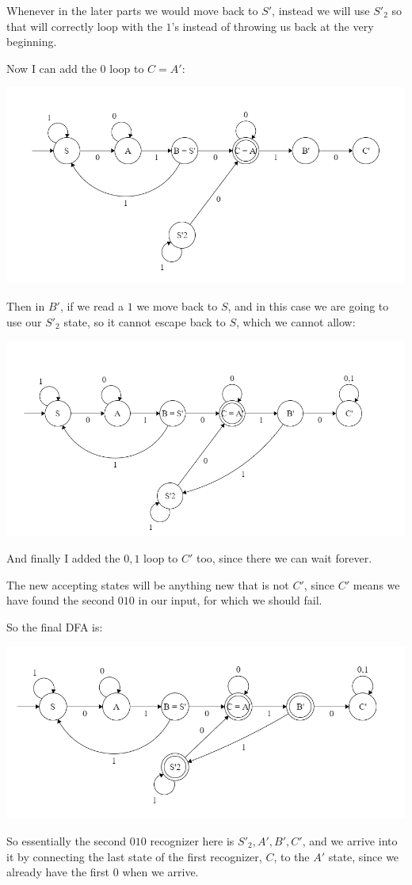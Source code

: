 Whenever in the later parts we would move back to $S'$, instead we will use $S'_2$ so that will correctly loop with the $1$'s instead of throwing us back at the very beginning.

Now I can add the $0$ loop to $C = A'$:

\begin{center}
    \includegraphics[width=\linewidth]{./exams/2019_01_06/01/step_4.png}
\end{center}

Then in $B'$, if we read a $1$ we move back to $S$, and in this case we are going to use our $S'_2$ state, so it cannot escape back to $S$, which we cannot allow:

\begin{center}
    \includegraphics[width=\linewidth]{./exams/2019_01_06/01/step_5.png}
\end{center}

And finally I added the $0,1$ loop to $C'$ too, since there we can wait forever.

The new accepting states will be anything new that is not $C'$, since $C'$ means we have found the second $010$ in our input, for which we should fail.

So the final DFA is:

\begin{center}
    \includegraphics[width=\linewidth]{./exams/2019_01_06/01/step_6.png}
\end{center}

So essentially the second $010$ recognizer here is $S'_2, A', B', C'$, and we arrive into it by connecting the last state of the first recognizer, $C$, to the $A'$ state, since we already have the first $0$ when we arrive.